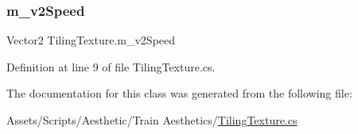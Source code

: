 \subsubsection{\texorpdfstring{m\+\_\+v2\+Speed}{m\_v2Speed}}
{\footnotesize\ttfamily Vector2 Tiling\+Texture.\+m\+\_\+v2\+Speed}



Definition at line 9 of file Tiling\+Texture.\+cs.



The documentation for this class was generated from the following file\+:\begin{DoxyCompactItemize}
\item 
Assets/\+Scripts/\+Aesthetic/\+Train Aesthetics/\mbox{\hyperlink{_tiling_texture_8cs}{Tiling\+Texture.\+cs}}\end{DoxyCompactItemize}
